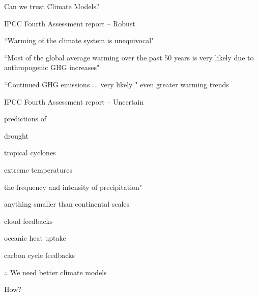 \begin{slide}{Can we trust Climate Models?}

\begin{list0}

\item {\color{purple} IPCC Fourth Assessment report -- Robust\pauseHS}

    \begin{list1}
    \item ``Warming of the climate system is unequivocal"
    \item ``Most of the global average warming over the past 50 years is {\color{red}very likely} due to anthropogenic GHG increases"
    \item ``Continued GHG emissions ... {\color{red}very likely} " even greater warming trends\pauseHS
    \end{list1}

\item {\color{purple} IPCC Fourth Assessment report -- Uncertain\pauseHS}

    \begin{list1}
    \item predictions of
    \begin{list2}
        \item drought
        \item tropical cyclones
        \item extreme temperatures
        \item the frequency and intensity of precipitation"\pauseHS
    \end{list2}
    \item anything smaller than continental scales\pauseHS
    \item cloud feedbacks
    \item oceanic heat uptake 
    \item carbon cycle feedbacks\pauseHS
    \end{list1}

\item {\color{purple} $\therefore$ We need better climate models\pauseHS}

\item {\color{purple} How?}
\end{list0}
\end{slide}

